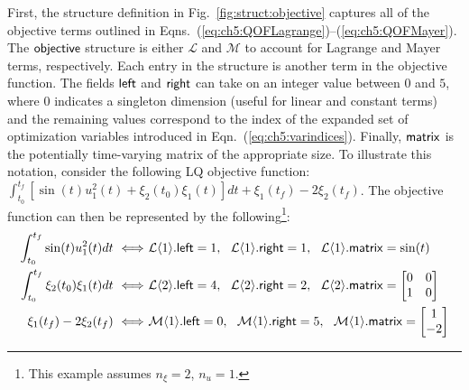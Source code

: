 First, the structure definition in Fig.~\ref{fig:struct:objective} captures all of the objective terms outlined in Eqns.~(\ref{eq:ch5:QOFLagrange})--(\ref{eq:ch5:QOFMayer}).
The $\textup{\textsf{objective}}$ structure is either $\mathcal{L}$ and $\mathcal{M}$ to account for Lagrange and Mayer terms, respectively.
Each entry in the structure is another term in the objective function.
The fields $\textup{\textsf{left}}$ and $\textup{\textsf{right}}$ can take on an integer value between $0$ and $5$, where $0$ indicates a singleton dimension (useful for linear and constant terms) and the remaining values correspond to the index of the expanded set of optimization variables introduced in Eqn.~(\ref{eq:ch5:varindices}).
Finally, $\textup{\textsf{matrix}}$ is the potentially time-varying matrix of the appropriate size.
To illustrate this notation, consider the following LQ objective function: $\int_{t_0}^{t_f} \left[\sin(t) u_1^2(t) + \xi_2(t_0) \xi_1(t) \right] dt + \xi_1(t_f) -2 \xi_2(t_f)$.
The objective function can then be represented by the following\footnote{This example assumes $n_{\xi}=2$, $n_u=1$.}:%
\allowdisplaybreaks[1]%
\begin{subequations}%
\begin{align}
\int_{t_0}^{t_f}\sin(t) u_1^2(t)dt \ \Longleftrightarrow& \ \mathcal{L}\xind{1}.\xvar{left} = 1, \ \ \mathcal{L}\xind{1}.\xvar{right} = 1, \ \ \mathcal{L}\xind{1}.\xvar{matrix} = \sin(t) \\
% 
\int_{t_0}^{t_f}  \xi_2(t_0) \xi_1(t) dt \ \Longleftrightarrow& \ \mathcal{L}\xind{2}.\xvar{left} = 4, \ \ \mathcal{L}\xind{2}.\xvar{right} = 2, \ \ \mathcal{L}\xind{2}.\xvar{matrix} = \begin{bmatrix} 0 & 0 \\ 1 & 0 \end{bmatrix} \\
% 
\xi_1(t_f) -2 \xi_2(t_f) \ \Longleftrightarrow& \ \mathcal{M}\xind{1}.\xvar{left} = 0, \ \ \mathcal{M}\xind{1}.\xvar{right} = 5, \ \ \mathcal{M}\xind{1}.\xvar{matrix} = \begin{bmatrix} 1 \\ -2 \end{bmatrix}
\end{align}
\end{subequations}%
\allowdisplaybreaks[0]%

